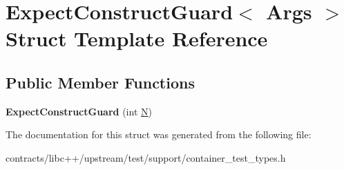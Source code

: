 \hypertarget{struct_expect_construct_guard}{}\section{Expect\+Construct\+Guard$<$ Args $>$ Struct Template Reference}
\label{struct_expect_construct_guard}
\subsection*{Public Member Functions}
\begin{DoxyCompactItemize}
\item 
\mbox{\label{struct_expect_construct_guard_a9bc7ea5390e278de8a0032cb0883b6ff}} 
{\bfseries Expect\+Construct\+Guard} (int \mbox{\hyperlink{group__types_gaf9c1edb0e0da55ec6ba09f32f6839529}{N}})
\end{DoxyCompactItemize}


The documentation for this struct was generated from the following file\+:\begin{DoxyCompactItemize}
\item 
contracts/libc++/upstream/test/support/container\+\_\+test\+\_\+types.\+h\end{DoxyCompactItemize}
